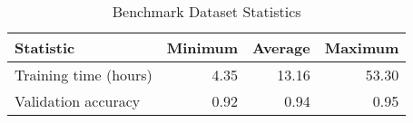\begin{table}[h]
    \centering
    \caption{Benchmark Dataset Statistics}
    \begin{tabular}{lrrr}
        \textbf{Statistic} & \textbf{Minimum} & \textbf{Average} & \textbf{Maximum} \\ \hline
        Training time (hours) & 4.35 & 13.16 & 53.30 \\
        \cellcolor{verylightgray}Validation accuracy & \cellcolor{verylightgray}0.92 & \cellcolor{verylightgray}0.94 & \cellcolor{verylightgray}0.95 \\
    \end{tabular}
    \label{tab:benchmark_stats}
\end{table}


